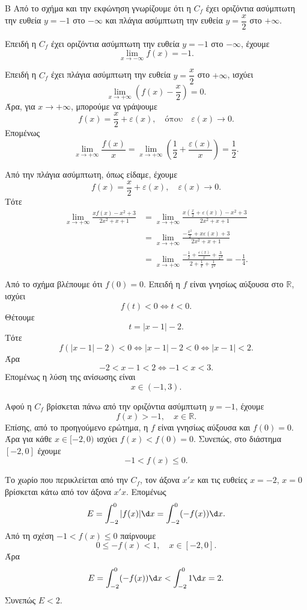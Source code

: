 \begin{thema}{Β}
Από το σχήμα και την εκφώνηση γνωρίζουμε ότι η $C_f$ έχει οριζόντια ασύμπτωτη την ευθεία $y=-1$ στο $-\infty$ και πλάγια ασύμπτωτη την ευθεία $y=\dfrac{x}{2}$ στο $+\infty$.

\begin{erwthma}
\item Επειδή η $C_f$ έχει οριζόντια ασύμπτωτη την ευθεία $y=-1$ στο $-\infty$, έχουμε
\[
\lim_{x\to -\infty}f(x)=-1.
\]

Επειδή η $C_f$ έχει πλάγια ασύμπτωτη την ευθεία $y=\dfrac{x}{2}$ στο $+\infty$, ισχύει
\[
\lim_{x\to +\infty}\left(f(x)-\frac{x}{2}\right)=0.
\]
Άρα, για $x\to+\infty$, μπορούμε να γράψουμε
\[
f(x)=\frac{x}{2}+\varepsilon(x),\quad \text{όπου}\quad \varepsilon(x)\to 0.
\]
Επομένως
\[
\lim_{x\to+\infty}\frac{f(x)}{x}
=\lim_{x\to+\infty}\left(\frac{1}{2}+\frac{\varepsilon(x)}{x}\right)
=\frac{1}{2}.
\]

\item Από την πλάγια ασύμπτωτη, όπως είδαμε, έχουμε
\[
f(x)=\frac{x}{2}+\varepsilon(x),\quad \varepsilon(x)\to 0.
\]
Τότε
\begin{align*}
\lim_{x\to+\infty}\frac{x f(x)-x^2+3}{2x^2+x+1}
&=\lim_{x\to+\infty}
\frac{x\left(\frac{x}{2}+\varepsilon(x)\right)-x^2+3}{2x^2+x+1}\\
&=\lim_{x\to+\infty}
\frac{-\frac{x^2}{2}+x\varepsilon(x)+3}{2x^2+x+1}\\
&=\lim_{x\to+\infty}
\frac{-\frac{1}{2}+\frac{\varepsilon(x)}{x}+\frac{3}{x^2}}{2+\frac{1}{x}+\frac{1}{x^2}}
=-\frac{1}{4}.
\end{align*}

\item Από το σχήμα βλέπουμε ότι $f(0)=0$. Επειδή η $f$ είναι γνησίως αύξουσα στο $\mathbb{R}$, ισχύει
\[
f(t)<0 \Leftrightarrow t<0.
\]
Θέτουμε
\[
t=|x-1|-2.
\]
Τότε
\[
f(|x-1|-2)<0
\Leftrightarrow
|x-1|-2<0
\Leftrightarrow
|x-1|<2.
\]
Άρα
\[
-2<x-1<2 \Leftrightarrow -1<x<3.
\]
Επομένως η λύση της ανίσωσης είναι
\[
x\in(-1,3).
\]

\item Αφού η $C_f$ βρίσκεται πάνω από την οριζόντια ασύμπτωτη $y=-1$, έχουμε
\[
f(x)>-1,\quad x\in\mathbb{R}.
\]
Επίσης, από το προηγούμενο ερώτημα, η $f$ είναι γνησίως αύξουσα και $f(0)=0$. Άρα για κάθε $x\in[-2,0)$ ισχύει $f(x)<f(0)=0$. Συνεπώς, στο διάστημα $[-2,0]$ έχουμε
\[
-1<f(x)\leq 0.
\]

Το χωρίο που περικλείεται από την $C_f$, τον άξονα $x'x$ και τις ευθείες $x=-2$, $x=0$ βρίσκεται κάτω από τον άξονα $x'x$. Επομένως
\[
E=\dint_{-2}^{0}|f(x)|\d x=\dint_{-2}^{0}(-f(x))\d x.
\]
Από τη σχέση $-1<f(x)\leq 0$ παίρνουμε
\[
0\leq -f(x)<1,\quad x\in[-2,0].
\]
Άρα
\[
E=\dint_{-2}^{0}(-f(x))\d x<\dint_{-2}^{0}1\d x=2.
\]
Συνεπώς $E<2$.
\end{erwthma}
\end{thema}

